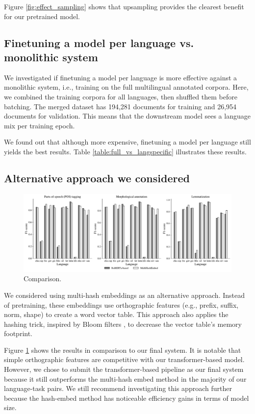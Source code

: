 \documentclass[11pt]{article}
\begin{document}
Figure \ref{fig:effect_sampling} shows that upsampling provides the clearest benefit for our pretrained model.

\subsection{Finetuning a model per language vs. monolithic system}

We investigated if finetuning a model per language is more effective against a monolithic system, i.e., training on the full multilingual annotated corpora.
Here, we combined the training corpora for all languages, then shuffled them before batching.
The merged dataset has 194,281 documents for training and 26,954 documents for validation.
This means that the downstream model sees a language mix per training epoch.

We found out that although more expensive, finetuning a model per language still yields the best results. 
Table \ref{table:full_vs_langspecific} illustrates these results.


\subsection{Alternative approach we considered}

\begin{figure}[t]
\centering
\includegraphics[width=\textwidth]{figures/hashembed.pdf}
\caption{Comparison.}
\label{fig:hashembed}
\end{figure}

We considered using multi-hash embeddings \cite{miranda-etal-2022-multi} as an alternative approach.
Instead of pretraining, these embeddings use orthographic features (e.g., prefix, suffix, norm, shape) to create a word vector table.
This approach also applies the hashing trick, inspired by Bloom filters \cite{bloom-1970-space}, to decrease the vector table's memory footprint.

Figure \ref{fig:hashembed} shows the results in comparison to our final system.
It is notable that simple orthographic features are competitive with our transformer-based model.
However, we chose to submit the transformer-based pipeline as our final system because it still outperforms the multi-hash embed method in the majority of our language-task pairs. 
We still recommend investigating this approach further because the hash-embed method has noticeable efficiency gains in terms of model size.
\end{document}
